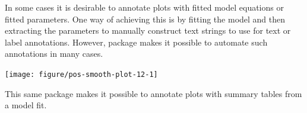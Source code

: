 \documentclass[krantz2]{krantz}\usepackage{knitr}%
\begin{document}
In some cases it is desirable to annotate plots with fitted model equations or fitted parameters. One way of achieving this is by fitting the model and then extracting the parameters to manually construct text strings to use for text or label annotations. However, package  makes it possible to automate such annotations in many cases.

\begin{knitrout}\footnotesize
{}\color{fgcolor}\begin{kframe}
\begin{alltt}
 \hlkwb{<-}  \hlopt{~}  \hlstd{)}
\hlstd{(}  \hlstd{(}     \hlstd{=}  \hlopt{+}
  \hlstd{(} \hlstd{=} \hlstd{,}    \hlstd{=} \hlstd{)} \hlopt{+}
  \hlstd{(}  \hlstd{(} 
                \hlstd{=} \hlstd{,}  \hlstd{=} \hlstd{,}  \hlstd{=} \hlstd{)} \hlopt{+}
  \hlstd{()}
\end{alltt}
\end{kframe}

{\centering \texttt{[image: figure/pos-smooth-plot-12-1]} 

}



\end{knitrout}

This same package makes it possible to annotate plots with summary tables from a model fit.
\end{document}
